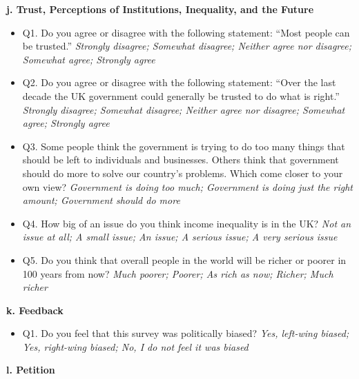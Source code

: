 \documentclass{article}
\begin{document}
\begin{flushleft}
\textbf{j. Trust, Perceptions of Institutions, Inequality, and the Future}
\end{flushleft}

\begin{itemize}
    \item Q1. Do you agree or disagree with the following statement: ``Most people can be trusted.''
    \textit{Strongly disagree; Somewhat disagree; Neither agree nor disagree; Somewhat agree; Strongly agree}
    \item Q2. Do you agree or disagree with the following statement: ``Over the last decade the UK government could generally be trusted to do what is right.''
    \textit{Strongly disagree; Somewhat disagree; Neither agree nor disagree; Somewhat agree; Strongly agree}
    \item Q3. Some people think the government is trying to do too many things that should be left to individuals and businesses. Others think that government should do more to solve our country's problems. Which come closer to your own view?
    \textit{Government is doing too much; Government is doing just the right amount; Government should do more}
    \item Q4. How big of an issue do you think income inequality is in the UK?
    \textit{Not an issue at all; A small issue; An issue; A serious issue; A very serious issue}
    \item Q5. Do you think that overall people in the world will be richer or poorer in 100 years from now?
    \textit{Much poorer; Poorer; As rich as now; Richer; Much richer}
\end{itemize}

\begin{flushleft}
\textbf{k. Feedback}
\end{flushleft}

\begin{itemize}
    \item Q1. Do you feel that this survey was politically biased?
    \textit{Yes, left-wing biased; Yes, right-wing biased; No, I do not feel it was biased}
\end{itemize}

\begin{flushleft}
\textbf{l. Petition}
\end{flushleft}
\end{document}
